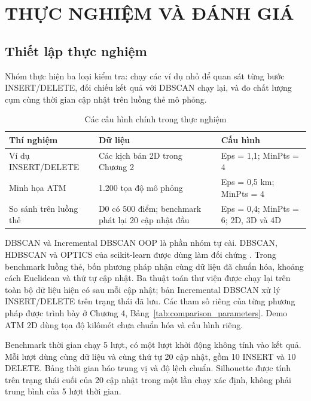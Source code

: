\chapter{THỰC NGHIỆM VÀ ĐÁNH GIÁ}

\section{Thiết lập thực nghiệm}

Nhóm thực hiện ba loại kiểm tra: chạy các ví dụ nhỏ để quan sát từng bước INSERT/DELETE, đối chiếu kết quả với DBSCAN chạy lại, và đo chất lượng cụm cùng thời gian cập nhật trên luồng thẻ mô phỏng.

\begin{table}[H]
\centering
\caption{Các cấu hình chính trong thực nghiệm}
\label{tab:experiment_setup}
\normalsize
\begin{tabularx}{\textwidth}{|P{3.2cm}|Y|P{3.5cm}|}\hline
\textbf{Thí nghiệm} & \textbf{Dữ liệu} & \textbf{Cấu hình} \\\hline
Ví dụ INSERT/DELETE & Các kịch bản 2D trong Chương 2 & Eps = 1,1; MinPts = 4 \\\hline
Minh họa ATM & 1.200 tọa độ mô phỏng & Eps = 0,5 km; MinPts = 4 \\\hline
So sánh trên luồng thẻ & D0 có 500 điểm; benchmark phát lại 20 cập nhật đầu & Eps = 0,4; MinPts = 6; 2D, 3D và 4D \\\hline
\end{tabularx}
\end{table}

DBSCAN và Incremental DBSCAN OOP là phần nhóm tự cài. DBSCAN, HDBSCAN và OPTICS của scikit-learn được dùng làm đối chứng \parencite{sklearnDBSCAN,sklearnHDBSCAN,sklearnOPTICS}. Trong benchmark luồng thẻ, bốn phương pháp nhận cùng dữ liệu đã chuẩn hóa, khoảng cách Euclidean và thứ tự cập nhật. Ba thuật toán thư viện được chạy lại trên toàn bộ dữ liệu hiện có sau mỗi cập nhật; bản Incremental DBSCAN xử lý INSERT/DELETE trên trạng thái đã lưu. Các tham số riêng của từng phương pháp được trình bày ở Chương 4, Bảng~\ref{tab:comparison_parameters}. Demo ATM 2D dùng tọa độ kilômét chưa chuẩn hóa và cấu hình riêng.

Benchmark thời gian chạy 5 lượt, có một lượt khởi động không tính vào kết quả. Mỗi lượt dùng cùng dữ liệu và cùng thứ tự 20 cập nhật, gồm 10 INSERT và 10 DELETE. Bảng thời gian báo trung vị và độ lệch chuẩn. Silhouette được tính trên trạng thái cuối của 20 cập nhật trong một lần chạy xác định, không phải trung bình của 5 lượt thời gian.

